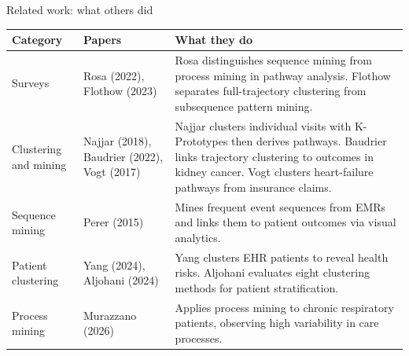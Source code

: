 \documentclass[aspectratio=169,11pt]{beamer}
\begin{document}
\begin{frame}{Related work: what others did}
  \scriptsize
  \renewcommand{\arraystretch}{1.3}
  \begin{tabular}{@{}>{\raggedright}p{2.0cm} >{\raggedright}p{2.7cm} >{\raggedright\arraybackslash}p{7.3cm}@{}}
    \toprule
    \textbf{Category} & \textbf{Papers} & \textbf{What they do} \\
    \midrule
    Surveys &
      Rosa (2022), Flothow (2023) &
      Rosa distinguishes sequence mining from process mining in pathway analysis. Flothow separates full-trajectory clustering from subsequence pattern mining. \\
    Clustering and mining &
      Najjar (2018), Baudrier (2022), Vogt (2017) &
      Najjar clusters individual visits with K-Prototypes then derives pathways. Baudrier links trajectory clustering to outcomes in kidney cancer. Vogt clusters heart-failure pathways from insurance claims. \\
    Sequence mining &
      Perer (2015) &
      Mines frequent event sequences from EMRs and links them to patient outcomes via visual analytics. \\
    Patient clustering &
      Yang (2024), Aljohani (2024) &
      Yang clusters EHR patients to reveal health risks. Aljohani evaluates eight clustering methods for patient stratification. \\
    Process mining &
      Murazzano (2026) &
      Applies process mining to chronic respiratory patients, observing high variability in care processes. \\
    \bottomrule
  \end{tabular}
\end{frame}
\end{document}
